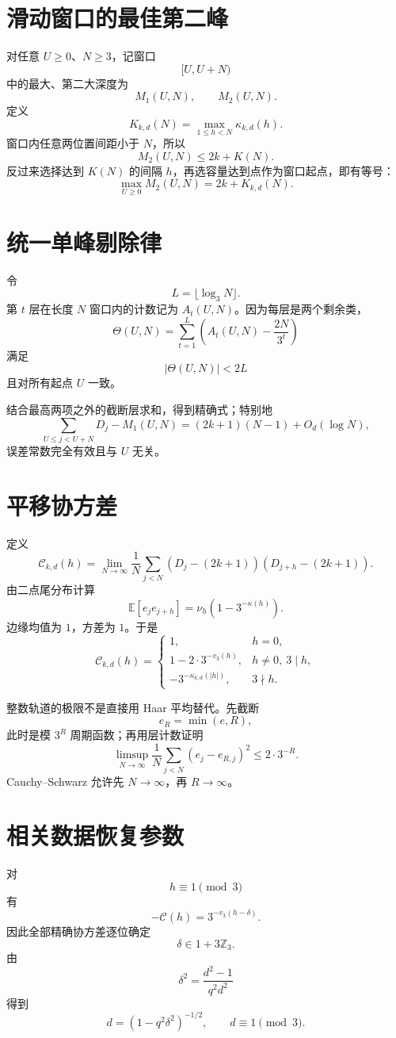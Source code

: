 \documentclass[11pt,a4paper]{ctexart}
\begin{document}
\section{滑动窗口的最佳第二峰}
对任意 \(U\ge0\)、\(N\ge3\)，记窗口
\[
[U,U+N)
\]
中的最大、第二大深度为
\[
M_1(U,N),\qquad M_2(U,N).
\]
定义
\[
K_{k,d}(N)=\max_{1\le h<N}\kappa_{k,d}(h).
\]
窗口内任意两位置间距小于 \(N\)，所以
\[
M_2(U,N)\le2k+K(N).
\]
反过来选择达到 \(K(N)\) 的间隔 \(h\)，再选容量达到点作为窗口起点，即有等号：
\[
\boxed{
\max_{U\ge0}M_2(U,N)
=
2k+K_{k,d}(N).
}
\]

\section{统一单峰剔除律}
令
\[
L=\lfloor\log_3N\rfloor.
\]
第 \(t\) 层在长度 \(N\) 窗口内的计数记为 \(A_t(U,N)\)。因为每层是两个剩余类，
\[
\Theta(U,N)
=
\sum_{t=1}^{L}
\left(
A_t(U,N)-\frac{2N}{3^t}
\right)
\]
满足
\[
|\Theta(U,N)|<2L
\]
且对所有起点 \(U\) 一致。

结合最高两项之外的截断层求和，得到精确式；特别地
\[
\boxed{
\sum_{U\le j<U+N}D_j-M_1(U,N)
=
(2k+1)(N-1)+O_d(\log N),
}
\]
误差常数完全有效且与 \(U\) 无关。

\section{平移协方差}
定义
\[
\mathcal C_{k,d}(h)
=
\lim_{N\to\infty}
\frac1N
\sum_{j<N}
(D_j-(2k+1))(D_{j+h}-(2k+1)).
\]
由二点尾分布计算
\[
\mathbb E[e_je_{j+h}]
=
\nu_h(1-3^{-\kappa(h)}).
\]
边缘均值为 \(1\)，方差为 \(1\)。于是
\[
\boxed{
\mathcal C_{k,d}(h)=
\begin{cases}
1,&h=0,\\
1-2\cdot3^{-v_3(h)},&h\ne0,\ 3\mid h,\\
-3^{-\kappa_{k,d}(|h|)},&3\nmid h.
\end{cases}
}
\]

整数轨道的极限不是直接用 Haar 平均替代。先截断
\[
e_R=\min(e,R),
\]
此时是模 \(3^R\) 周期函数；再用层计数证明
\[
\limsup_{N\to\infty}
\frac1N
\sum_{j<N}(e_j-e_{R,j})^2
\le
2\cdot3^{-R}.
\]
Cauchy--Schwarz 允许先 \(N\to\infty\)，再 \(R\to\infty\)。

\section{相关数据恢复参数}
对
\[
h\equiv1\pmod3
\]
有
\[
-\mathcal C(h)=3^{-v_3(h-\delta)}.
\]
因此全部精确协方差逐位确定
\[
\delta\in1+3\mathbb Z_3.
\]
由
\[
\delta^2=\frac{d^2-1}{q^2d^2}
\]
得到
\[
\boxed{
d=(1-q^2\delta^2)^{-1/2},
\qquad d\equiv1\pmod3.
}
\]
\end{document}
